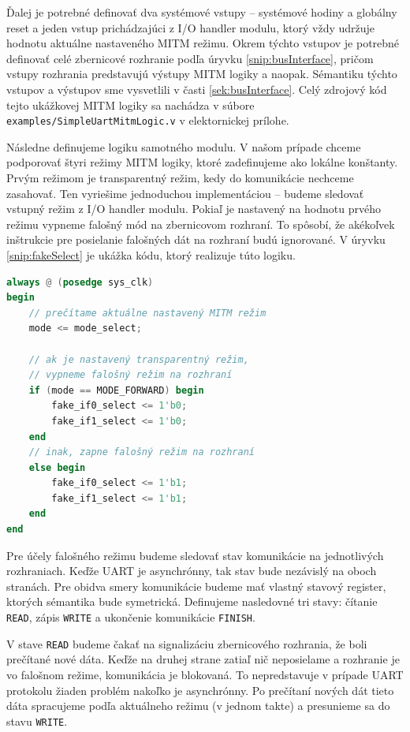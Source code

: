 Ďalej je potrebné definovať dva systémové vstupy -- systémové hodiny a globálny reset a jeden vstup prichádzajúci z I/O handler modulu, ktorý vždy udržuje hodnotu aktuálne nastaveného MITM režimu. Okrem týchto vstupov je potrebné definovať celé zbernicové rozhranie podľa úryvku \ref{snip:busInterface}, pričom vstupy rozhrania predstavujú výstupy MITM logiky a naopak. Sémantiku týchto vstupov a výstupov sme vysvetlili v časti \ref{sek:busInterface}. Celý zdrojový kód tejto ukážkovej MITM logiky sa nachádza v súbore \texttt{examples/SimpleUartMitmLogic.v} v elektornickej prílohe.

Následne definujeme logiku samotného modulu. V našom prípade chceme podporovať štyri režimy MITM logiky, ktoré zadefinujeme ako lokálne konštanty. Prvým režimom je transparentný režim, kedy do komunikácie nechceme zasahovať. Ten vyriešime jednoduchou implementáciou -- budeme sledovať vstupný režim z I/O handler modulu. Pokiaľ je nastavený na hodnotu prvého režimu vypneme falošný mód na zbernicovom rozhraní. To spôsobí, že akékoľvek inštrukcie pre posielanie falošných dát na rozhraní budú ignorované. V úryvku \ref{snip:fakeSelect} je ukážka kódu, ktorý realizuje túto logiku.

\begin{lstlisting}[float,language=Verilog,caption={Prepínanie medzi transparantným a falošným režimom MITM logiky.},label=snip:fakeSelect]
always @ (posedge sys_clk)
begin
    // prečítame aktuálne nastavený MITM režim
    mode <= mode_select;

    // ak je nastavený transparentný režim,
    // vypneme falošný režim na rozhraní
    if (mode == MODE_FORWARD) begin
        fake_if0_select <= 1'b0;
        fake_if1_select <= 1'b0;
    end
    // inak, zapne falošný režim na rozhraní
    else begin
        fake_if0_select <= 1'b1;
        fake_if1_select <= 1'b1;
    end
end
\end{lstlisting}

Pre účely falošného režimu budeme sledovať stav komunikácie na jednotlivých rozhraniach. Keďže UART je asynchrónny, tak stav bude nezávislý na oboch stranách. Pre obidva smery komunikácie budeme mať vlastný stavový register, ktorých sémantika bude symetrická. Definujeme nasledovné tri stavy: čítanie \texttt{READ}, zápis \texttt{WRITE} a ukončenie komunikácie \texttt{FINISH}.

V stave \texttt{READ} budeme čakať na signalizáciu zbernicového rozhrania, že boli prečítané nové dáta. Keďže na druhej strane zatiaľ nič neposielame a rozhranie je vo falošnom režime, komunikácia je blokovaná. To nepredstavuje v prípade UART protokolu žiaden problém nakoľko je asynchrónny. Po prečítaní nových dát tieto dáta spracujeme podľa aktuálneho režimu (v jednom takte) a presunieme sa do stavu \texttt{WRITE}.

